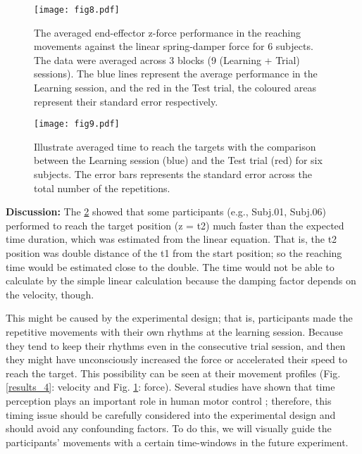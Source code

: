 \begin{figure}
	\centering
	\texttt{[image: fig8.pdf]}
	\caption{The averaged end-effector z-force performance in the reaching 
		movements against the linear spring-damper force for 6 subjects. 
		The data were averaged across 3 blocks (9 (Learning + Trial) sessions). 
		The blue lines represent the average performance in the Learning session, 
		and the red in the Test trial, the coloured areas represent their standard 
		error respectively.}
	\label{results_5}
\end{figure}

\begin{figure}
	\centering
	\texttt{[image: fig9.pdf]}
	\caption{Illustrate averaged time to reach the targets with the comparison 
		between the Learning session (blue) and the Test trial (red) for six 
		subjects. The error bars represents the standard error across the total 
		number of the repetitions.}
	\label{results_6}
\end{figure}



\textbf{Discussion:} The \ref{results_6} showed that some participants (e.g., Subj.01, Subj.06) performed to 
reach the target position (z = t2) much faster than the expected time duration, 
which was estimated from the linear equation. That is, the t2 position was 
double distance of the t1 from the start position; so the reaching time would 
be estimated close to the double. The time would not be able to calculate by 
the simple linear calculation because the damping factor depends on the 
velocity, though.

This might be caused by the experimental design; that is, participants made
the repetitive movements with their own rhythms at the learning
session. Because they tend to keep their rhythms even in the consecutive trial
session, and then they might have unconsciously increased the force or
accelerated their speed to reach the target. This possibility can be seen at
their movement profiles (Fig. \ref{results_4}: velocity and Fig. \ref{results_5}: force). Several studies
have shown that time perception plays an important role in human motor control
\cite{Berret&Jean16, Rank&DiLuca15}; therefore, this timing issue should be
carefully considered into the experimental design and should avoid any
confounding factors. To do this, we will visually guide the participants'
movements with a certain time-windows in the future experiment.

